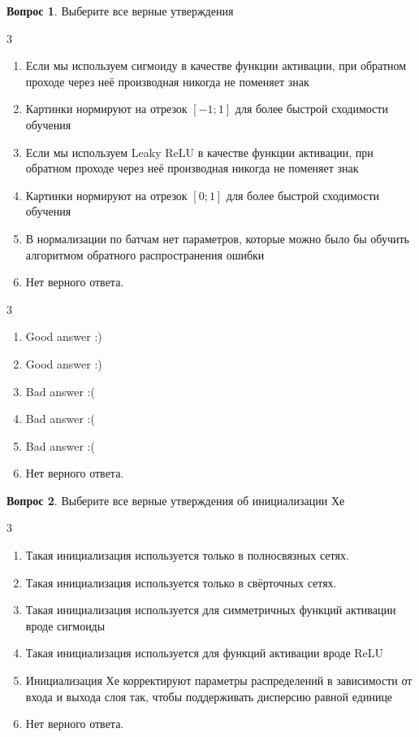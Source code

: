 \documentclass[12pt]{article}
\newenvironment{answerlist}[1][3]{
\begin{multicols}{#1}

\begin{enumerate}[label=\fbox{\emph{\Alph*}},ref=\emph{\alph*}]
}
{
\item Нет верного ответа.
\end{enumerate}
\end{multicols}
}
\theoremstyle{definition}
\newtheorem{question}{Вопрос}
\begin{document}
\begin{question}
Выберите все верные утверждения 
\begin{answerlist}
  \item Если мы используем сигмоиду в качестве функции активации, при обратном проходе через неё производная никогда не поменяет знак
  \item Картинки нормируют на отрезок $[-1; 1]$ для более быстрой сходимости обучения
  \item Если мы используем Leaky ReLU в качестве функции активации, при обратном проходе через неё производная никогда не поменяет знак
  \item Картинки нормируют на отрезок $[0; 1]$ для более быстрой сходимости обучения
  \item В нормализации по батчам нет параметров, которые можно было бы обучить алгоритмом обратного распространения ошибки
\end{answerlist}
\end{question}

\begin{solution}
\begin{answerlist}
  \item Good answer :)
  \item Good answer :)
  \item Bad answer :(
  \item Bad answer :(
  \item Bad answer :(
\end{answerlist}
\end{solution}


\begin{question}
Выберите все верные утверждения об инициализации Хе
\begin{answerlist}
  \item Такая инициализация используется только в полносвязных сетях.
  \item Такая инициализация используется только в свёрточных сетях.
  \item Такая инициализация используется для симметричных функций активации вроде сигмоиды
  \item Такая инициализация используется для функций активации вроде ReLU
  \item Инициализация Хе корректируют параметры распределений в зависимости от входа и выхода слоя так, чтобы поддерживать дисперсию равной единице
\end{answerlist}
\end{question}
\end{document}
